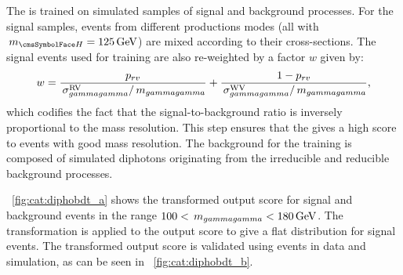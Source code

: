 The \DiPhoBdt is trained on simulated samples of signal and background processes. For the signal samples, events from different productions modes (all with $\mH=125\GeV$) are mixed according to their cross-sections. The signal events used for training are also re-weighted by a factor $w$ given by: 
\begin{equation}
w= \frac{p_{rv}}{\,\sigma^\text{RV}_{gammagamma}/\,m_{gammagamma}}+\frac{1-p_{rv}}{\,\sigma^\text{WV}_{gammagamma}/\,m_{gammagamma}},
\end{equation} 
which codifies the fact that the signal-to-background ratio is inversely proportional to the mass resolution. This step ensures that the \DiPhoBdt gives a high score to events with good mass resolution.
The background for the training is composed of simulated diphotons originating from the irreducible and reducible \SM background processes. 

\Fig~\ref{fig:cat:diphobdt_a} shows the transformed \DiPhoBdt output score for signal and background events in the range $100 < \,m_{gammagamma} < 180\,\text{Ge\hspace{-.08em}V}$. The transformation is applied to the \DiPhoBdt output score to give a flat distribution for signal events. The transformed \DiPhoBdt output score is validated using \Zee events in data and simulation, as can be seen in \Fig~\ref{fig:cat:diphobdt_b}.
